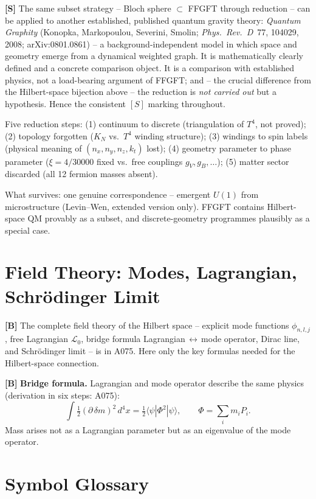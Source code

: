 \textbf{[S]} The same subset strategy -- Bloch sphere $\subset$ FFGFT through
reduction -- can be applied to another established, published quantum gravity
theory: \emph{Quantum Graphity} (Konopka, Markopoulou, Severini, Smolin;
\emph{Phys.~Rev.~D}~77, 104029, 2008; arXiv:0801.0861) -- a background-independent
model in which space and geometry emerge from a dynamical weighted graph. It is
mathematically clearly defined and a concrete comparison object. It is a comparison
with established physics, not a load-bearing argument of FFGFT; and -- the crucial
difference from the Hilbert-space bijection above -- the reduction is \emph{not
carried out} but a hypothesis. Hence the consistent $[S]$ marking throughout.

Five reduction steps: (1) continuum to discrete (triangulation of $T^4$, not
proved); (2) topology forgotten ($K_N$ vs.\ $T^4$ winding structure); (3) windings
to spin labels (physical meaning of $(n_x,n_y,n_z,k_t)$ lost); (4) geometry
parameter to phase parameter ($\xi=4/30000$ fixed vs.\ free couplings
$g_V,g_B,\ldots$); (5) matter sector discarded (all 12 fermion masses absent).

What survives: one genuine correspondence -- emergent $U(1)$ from microstructure
(Levin--Wen, extended version only). FFGFT contains Hilbert-space QM provably as
a subset, and discrete-geometry programmes plausibly as a special case.

\section{Field Theory: Modes, Lagrangian, Schrödinger Limit}

\textbf{[B]} The complete field theory of the Hilbert space -- explicit mode
functions $\phi_{n,l,j}$, free Lagrangian $\mathcal L_0$, bridge formula
Lagrangian$\,\leftrightarrow\,$mode operator, Dirac line, and Schrödinger limit
-- is in A075. Here only the key formulas needed for the Hilbert-space connection.

\textbf{[B]} \textbf{Bridge formula.} Lagrangian and mode operator describe
the same physics (derivation in six steps: A075):
\[
  \int\tfrac12(\partial\,\delta m)^2\,d^4x
  = \tfrac12\langle\psi|\Phi^2|\psi\rangle,
  \qquad \Phi = \sum_i m_i P_i.
\]
Mass arises not as a Lagrangian parameter but as an eigenvalue of the mode operator.

\section{Symbol Glossary}

